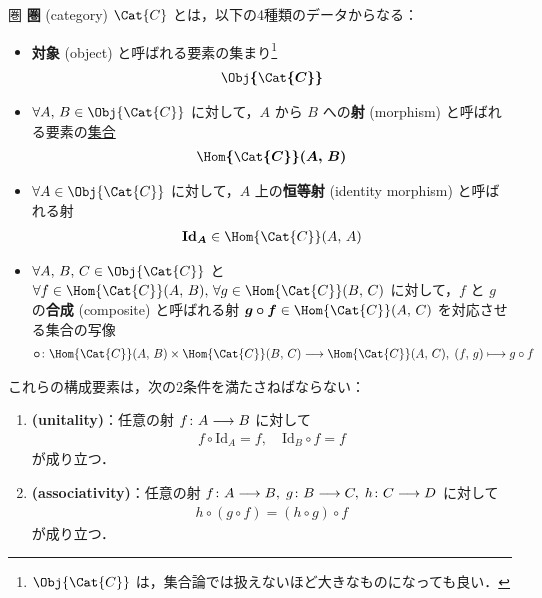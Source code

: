 \documentclass[TQFT_main]{subfiles}
\begin{document}
\begin{mydef}[label=def:category, breakable]{圏}
	\textbf{圏} (category) $\Cat{C}$ とは，以下の4種類のデータからなる：
	\begin{itemize}
		\item \textbf{対象} (object) と呼ばれる要素の集まり\footnote{$\Obj{\Cat{C}}$ は，集合論では扱えないほど大きなものになっても良い．}
		\begin{align}
			\bm{\Obj{\Cat{C}}}
		\end{align}
		
		\item $\forall A,\, B \in \Obj{\Cat{C}}$ に対して，$A$ から $B$ への\textbf{射} (morphism) と呼ばれる要素の\underline{集合}
		\begin{align}
			\bm{\Hom{\Cat{C}}(A,\, B)}
		\end{align}
		
		\item $\forall A \in \Obj{\Cat{C}}$ に対して，$A$ 上の\textbf{恒等射} (identity morphism) と呼ばれる射
		\begin{align}
			\bm{\mathrm{Id}_A} \in \Hom{\Cat{C}}(A,\, A)
		\end{align}
		
		\item $\forall A,\, B,\, C \in \Obj{\Cat{C}}$ と $\forall f \in \Hom{\Cat{C}}(A,\, B),\, \forall g \in \Hom{\Cat{C}}(B,\, C)$ に対して，$f$ と $g$ の\textbf{合成} (composite) と呼ばれる射 $\bm{g \circ f} \in \Hom{\Cat{C}}(A,\, C)$ を対応させる集合の写像
		\begin{align}
			\bm{\circ} \colon \Hom{\Cat{C}}(A,\, B) \times \Hom{\Cat{C}}(B,\, C) \lto \Hom{\Cat{C}}(A,\, C),\; (f,\, g) \lmto g\circ f
		\end{align}
	\end{itemize}
	これらの構成要素は，次の2条件を満たさねばならない：
	\begin{enumerate}
		\item \textbf{(unitality)}：任意の射 $f \colon A \longrightarrow B$ に対して
		\begin{align}
			f \circ \mathrm{Id}_A = f,\quad \mathrm{Id}_B \circ f = f
		\end{align}
		が成り立つ．
		\item \textbf{(associativity)}：任意の射 $f \colon A \longrightarrow B,\; g \colon B \longrightarrow C,\; h \colon C \longrightarrow D$ に対して
		\begin{align}
			h \circ (g \circ f) = (h \circ g) \circ f
		\end{align}
		が成り立つ．
	\end{enumerate}
\end{mydef}
\end{document}
